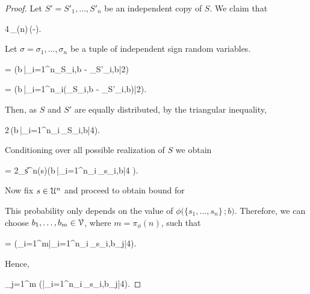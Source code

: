 \documentclass[scombinatorics.tex]{subfiles}
\begin{document}
\begin{proof}
  Let $S'=S'_1,\dots,S'_n$ be an independent copy of $S$.
  We claim that

  {\le}
  {4\,\pi_\phi(n)\,\exp\bigg(-\bigg).}

  Let $\sigma=\sigma_1,\dots,\sigma_n$ be a tuple of independent sign random variables.

  {=}
  {\Pr\bigg(\!\E b{\in}\V\,\Big|\sum_{i=1}^n\Indicator_{S_i,b} - \Indicator_{S'_i,b}\Big|\ge{}2\bigg)}
  \smallskip
  

  \ceq{\hfill}
  {=}
  {\Pr\bigg(\!\E b{\in}\V\,\Big|\sum_{i=1}^n\sigma_i\big(\Indicator_{S_i,b} - \Indicator_{S'_i,b}\big)\Big|\ge{}2\bigg).}
  \smallskip

  Then, as $S$ and $S'$ are equally distributed, by the triangular inequality, 

  \ceq{}
  {\le}
  {2\,\Pr\bigg(\!\E b{\in}\V\,\Big|\sum_{i=1}^n\sigma_i\,\Indicator_{S_i,b}\Big|\ge{}4\bigg).}

  Conditioning over all possible  realization of $S$ we obtain

  {=}
  {2\!\sum_{s\in\U^n}\Pr(s)\cdot\Pr\bigg(\!\E b{\in}\V\,\Big|\sum_{i=1}^n\sigma_i\,\Indicator_{s_i,b}\Big|\ge{}4 \bigg).}

  Now fix $s\in\EuScript U^n$ and proceed to obtain bound for 

  {}{}
  \smallskip

  This probability only depends on the value of $\phi\big(\{s_1,\dots,s_n\}\,;b\big)$.
  Therefore, we can choose $b_1,\dots,b_m\in\EuScript V$, where $m=\pi_\phi(n)$, such that

  \ceq{}
  {=}
  {\Pr\bigg(\bigvee_{i=1}^{m}\Big|\sum_{i=1}^n\sigma_i\,\Indicator_{s_i,b_j}\Big|\ge{}4\bigg).}

  Hence,

  \ceq{}
  {\le}
  {\sum_{j=1}^m \Pr\bigg(\Big|\sum_{i=1}^n\sigma_i\,\Indicator_{s_i,b_j}\Big|\ge{}4\bigg).}
  

\end{proof}
\end{document}
